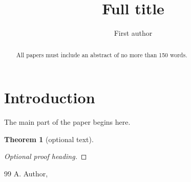 \documentclass{baustms}
\theoremstyle{cupthm}
\newtheorem{thm}{Theorem}[section]
\theoremstyle{cupdefn}
\theoremstyle{cuprem}
\numberwithin{equation}{section}
\begin{document}
\title{Full title}
\author[1]{First author}
\address[1]{Address of first author}




\begin{abstract}
All papers must include an abstract of no more than 150 words.
\end{abstract}


\maketitle

\section{Introduction}
The main part of the paper begins here.


\begin{thm}[optional text]
\end{thm}

\begin{proof}[Optional proof heading]
\end{proof}



\ack %


\begin{thebibliography}{99}
 A. Author,

\end{thebibliography}

%
%
\end{document}
